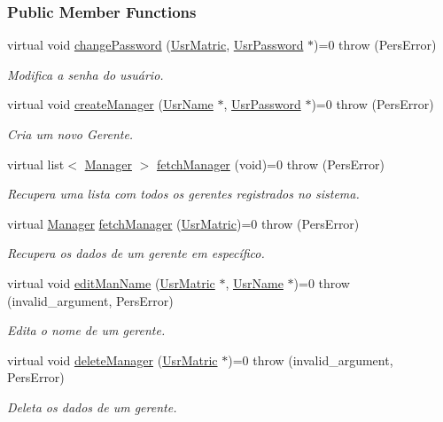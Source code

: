 \subsubsection*{Public Member Functions}
\begin{DoxyCompactItemize}
\item 
virtual void \hyperlink{classUserManAdm_a063745d21053a5e071ce1f4c6a1c3c55}{change\-Password} (\hyperlink{classUsrMatric}{Usr\-Matric}, \hyperlink{classUsrPassword}{Usr\-Password} $\ast$)=0  throw (\-Pers\-Error)
\begin{DoxyCompactList}\small\item\em Modifica a senha do usuário. \end{DoxyCompactList}\item 
virtual void \hyperlink{classUserManAdm_a4c1d61e8190867eb786cdf97083ba289}{create\-Manager} (\hyperlink{classUsrName}{Usr\-Name} $\ast$, \hyperlink{classUsrPassword}{Usr\-Password} $\ast$)=0  throw (\-Pers\-Error)
\begin{DoxyCompactList}\small\item\em Cria um novo Gerente. \end{DoxyCompactList}\item 
virtual list$<$ \hyperlink{classManager}{Manager} $>$ \hyperlink{classUserManAdm_a05b8b4f5b1e42b7b9f77d6a40b90dbb2}{fetch\-Manager} (void)=0  throw (\-Pers\-Error)
\begin{DoxyCompactList}\small\item\em Recupera uma lista com todos os gerentes registrados no sistema. \end{DoxyCompactList}\item 
virtual \hyperlink{classManager}{Manager} \hyperlink{classUserManAdm_a62e826d1c11061df021016e94e88f9ba}{fetch\-Manager} (\hyperlink{classUsrMatric}{Usr\-Matric})=0  throw (\-Pers\-Error)
\begin{DoxyCompactList}\small\item\em Recupera os dados de um gerente em específico. \end{DoxyCompactList}\item 
virtual void \hyperlink{classUserManAdm_a0440de1c9d712a8dac1aa4e526d0fe9b}{edit\-Man\-Name} (\hyperlink{classUsrMatric}{Usr\-Matric} $\ast$, \hyperlink{classUsrName}{Usr\-Name} $\ast$)=0  throw (invalid\-\_\-argument, Pers\-Error)
\begin{DoxyCompactList}\small\item\em Edita o nome de um gerente. \end{DoxyCompactList}\item 
virtual void \hyperlink{classUserManAdm_a3fd6ddb6b71743fe5ece3100206023c3}{delete\-Manager} (\hyperlink{classUsrMatric}{Usr\-Matric} $\ast$)=0  throw (invalid\-\_\-argument, Pers\-Error)
\begin{DoxyCompactList}\small\item\em Deleta os dados de um gerente. \end{DoxyCompactList}\end{DoxyCompactItemize}


